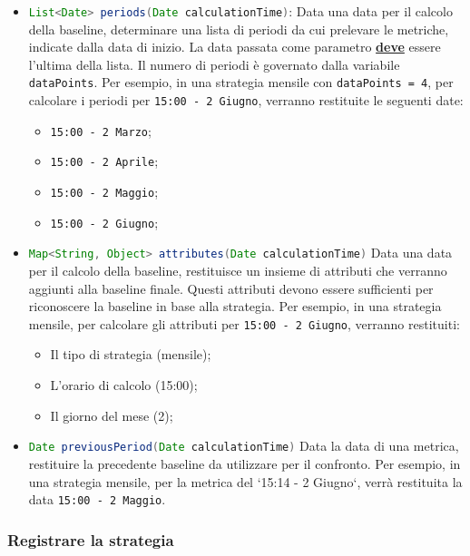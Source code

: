 		\begin{itemize}
	
			\item \lstinline[language=Java]{List<Date> periods(Date calculationTime)}:
				Data una data per il calcolo della baseline, determinare una lista di periodi 
				da cui prelevare le metriche, indicate dalla data di inizio.
				La data passata come parametro \textbf{\underline{\large deve}} essere l'ultima della lista.
				Il numero di periodi è governato dalla variabile \lstinline{dataPoints}.
				Per esempio, in una strategia mensile con \lstinline{dataPoints = 4}, per calcolare i periodi 
				per \lstinline{15:00 - 2 Giugno}, verranno restituite le seguenti date:
				\begin{itemize}
					\item \lstinline{15:00 - 2 Marzo};
					\item \lstinline{15:00 - 2 Aprile};
					\item \lstinline{15:00 - 2 Maggio};
					\item \lstinline{15:00 - 2 Giugno};			
				\end{itemize}
			
			\item \lstinline[language=Java]{Map<String, Object> attributes(Date calculationTime)}
				Data una data per il calcolo della baseline, restituisce un insieme di attributi 
				che verranno aggiunti alla baseline finale. 
				Questi attributi devono essere sufficienti per riconoscere la baseline in base alla strategia.
				Per esempio, in una strategia mensile, per calcolare gli attributi per \lstinline{15:00 - 2 Giugno}, 
				verranno restituiti:
				\begin{itemize}
					\item Il tipo di strategia (mensile);
					\item L'orario di calcolo (15:00);
					\item Il giorno del mese (2);
				\end{itemize}
				
			\item \lstinline[language=Java]{Date previousPeriod(Date calculationTime)}
				Data la data di una metrica, restituire la precedente baseline da utilizzare per il confronto.
				Per esempio, in una strategia mensile, per la metrica del `15:14 - 2 Giugno`, 
				verrà restituita la data \lstinline{15:00 - 2 Maggio}. 

		\end{itemize}
	\subsubsection{Registrare la strategia}

